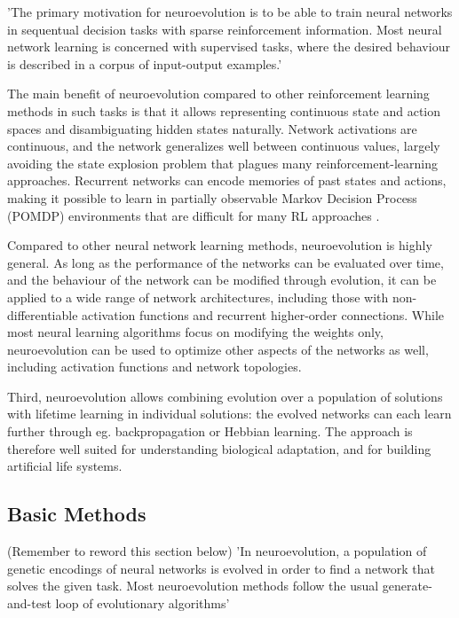 'The primary motivation for neuroevolution is to be able to train neural networks in sequentual decision tasks with sparse reinforcement information. Most neural network learning is concerned with supervised tasks, where the desired behaviour is described in a corpus of input-output examples.' \cite{Miikkulainen2010}

The main benefit of neuroevolution compared to other reinforcement learning methods in such tasks is that it allows representing continuous state and action spaces and disambiguating hidden states naturally.
Network activations are continuous, and the network generalizes well between continuous values, largely avoiding the state explosion problem that plagues many reinforcement-learning approaches. Recurrent networks can encode memories of past states and actions, making it possible to learn in partially observable Markov Decision Process (POMDP) environments that are difficult for many RL approaches \cite{Miikkulainen2010}.

Compared to other neural network learning methods, neuroevolution is highly general. As long as the performance of the networks can be evaluated over time, and the behaviour of the network can be modified through evolution, it can be applied to a wide range of network architectures, including those with non-differentiable activation functions and recurrent  higher-order connections. While most neural learning algorithms focus on modifying the weights only, neuroevolution can be used to optimize other aspects of the networks as well, including activation functions and network topologies.

Third, neuroevolution allows combining evolution over a population of solutions with lifetime learning in individual solutions: the evolved networks can each learn further through eg. backpropagation or Hebbian learning. The approach is therefore well suited for understanding biological adaptation, and for building artificial life systems.

\subsection{Basic Methods}
(Remember to reword this section below)
'In neuroevolution, a population of genetic encodings of neural networks is evolved in order to find a network that solves the given task. Most neuroevolution methods follow the usual generate-and-test loop of evolutionary algorithms' \cite{Miikkulainen2010}

